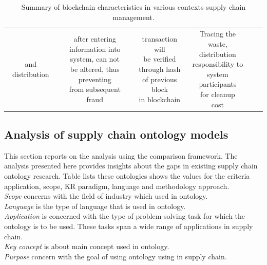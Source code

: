 \begin{table}[h!]
\begin{center}
\begin{adjustwidth}{-1cm}{}
\begin{tabular} { c | c | c | c | c | c }
{ 		and distribution} & \tiny \makecell{after entering\\ information into\\ system, can not\\ be altered, thus preventing\\ from subsequent\\ fraud} & \tiny \makecell{transaction will\\ be verified\\ through hash\\ of previous block\\ in blockchain} & \tiny \makecell{Tracing the waste, \\distribution\\ responsibility to\\ system participants \\for cleanup\\ cost}
 	    
 	   
	 		
 	\end{tabular}
  \end{adjustwidth}
 \caption {Summary of blockchain characteristics in various contexts supply chain management.}
 \end{center}
\end{table}

\subsection{Analysis of supply chain ontology models}

This section reports on the analysis using the comparison
framework. The analysis presented here provides insights about
the gaps in existing supply chain ontology research. Table lists these ontologies shows the
values for the criteria application, scope, KR paradigm, language and methodology approach.\\
\textit{Scope} concerns with the field of industry which used in ontology.\\
\textit{Language} is the type of language that is used in ontology.\\
\textit{Application} is concerned with the type of problem-solving task for which the ontology is to be used.
These tasks span a wide range of applications in supply chain.\\
\textit{Key concept} is about main concept used in ontology.\\
\textit{Purpose} concern with the goal of using ontology using in supply chain\cite{Tonci}.\\ 


